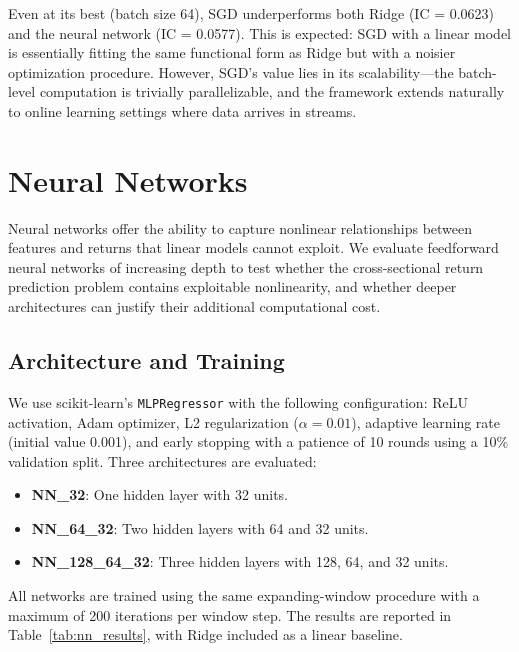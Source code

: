 \documentclass[11pt]{article}
\begin{document}
Even at its best (batch size 64), SGD underperforms both Ridge (IC = 0.0623) and the neural network (IC = 0.0577). This is expected: SGD with a linear model is essentially fitting the same functional form as Ridge but with a noisier optimization procedure. However, SGD's value lies in its scalability---the batch-level computation is trivially parallelizable, and the framework extends naturally to online learning settings where data arrives in streams.

\section{Neural Networks}
\label{sec:neural_net}

Neural networks offer the ability to capture nonlinear relationships between features and returns that linear models cannot exploit. We evaluate feedforward neural networks of increasing depth to test whether the cross-sectional return prediction problem contains exploitable nonlinearity, and whether deeper architectures can justify their additional computational cost.

\subsection{Architecture and Training}

We use scikit-learn's \verb|MLPRegressor| with the following configuration: ReLU activation, Adam optimizer, L2 regularization ($\alpha = 0.01$), adaptive learning rate (initial value 0.001), and early stopping with a patience of 10 rounds using a 10\% validation split. Three architectures are evaluated:

\begin{itemize}
    \item \textbf{NN\_32}: One hidden layer with 32 units.
    \item \textbf{NN\_64\_32}: Two hidden layers with 64 and 32 units.
    \item \textbf{NN\_128\_64\_32}: Three hidden layers with 128, 64, and 32 units.
\end{itemize}

All networks are trained using the same expanding-window procedure with a maximum of 200 iterations per window step. The results are reported in Table~\ref{tab:nn_results}, with Ridge included as a linear baseline.
\end{document}
